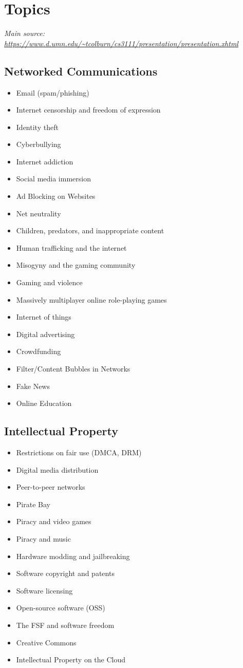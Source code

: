 \documentclass[12pt,a4paper]{report}
\begin{document}
\section*{Topics}
\emph{Main source: \url{https://www.d.umn.edu/~tcolburn/cs3111/presentation/presentation.xhtml}}
\subsection*{Networked Communications}
\begin{itemize}
\item Email (spam/phishing)
\item Internet censorship and freedom of expression
\item Identity theft
\item Cyberbullying
\item Internet addiction
\item Social media immersion
\item Ad Blocking on Websites
\item Net neutrality
\item Children, predators, and inappropriate content
\item Human trafficking and the internet
\item Misogyny and the gaming community
\item Gaming and violence
\item Massively multiplayer online role-playing games
\item Internet of things
\item Digital advertising
\item Crowdfunding
\item Filter/Content Bubbles in Networks
\item Fake News
\item Online Education
\end{itemize}
\subsection*{Intellectual Property} 
\begin{itemize}
\item Restrictions on fair use (DMCA, DRM)
\item Digital media distribution
\item Peer-to-peer networks
\item Pirate Bay
\item Piracy and video games
\item Piracy and music
\item Hardware modding and jailbreaking
\item Software copyright and patents
\item Software licensing
\item Open-source software (OSS)
\item The FSF and software freedom
\item Creative Commons
\item Intellectual Property on the Cloud
\end{itemize}
\end{document}
